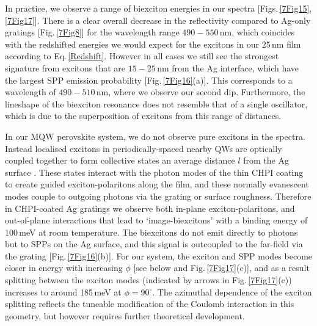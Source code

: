 In practice, we observe a range of biexciton energies in our spectra [Figs.\,\ref{7Fig15},\ref{7Fig17}]. There is a clear overall decrease in the reflectivity compared to Ag-only gratings [Fig.\,\ref{7Fig8}] for the wavelength range $490-550$\,nm, which coincides with the redshifted energies we would expect for the excitons in our 25\,nm film according to Eq.\,\ref{Redshift}. However in all cases we still see the strongest signature from excitons that are $15-25$\,nm from the Ag interface, which have the largest SPP emission probability [Fig.\,\ref{7Fig16}(a)]. This corresponds to a wavelength of $490-510$\,nm, where we observe our second dip. Furthermore, the lineshape of the biexciton resonance does not resemble that of a single oscillator, which is due to the superposition of excitons from this range of distances. %

In our MQW perovskite system, we do not observe pure excitons in the spectra. Instead localised excitons in periodically-spaced nearby QWs are optically coupled together to form collective states an average distance $l$ from the Ag surface \cite{Pbbr2008, Baumberg1998, Kavokin1998, Vladimirova1998}. These states interact with the photon modes of the thin CHPI coating to create guided exciton-polaritons along the film, and these normally evanescent modes couple to outgoing photons via the grating or surface roughness. %
Therefore in CHPI-coated Ag gratings we observe both in-plane exciton-polaritons, and out-of-plane interactions that lead to `image-biexcitons' %
with a binding energy of 100\,meV at room temperature. The biexcitons do not emit directly to photons but to SPPs on the Ag surface, and this signal is outcoupled to the far-field via the grating [Fig.\,\ref{7Fig16}(b)]. %
For our system, the exciton and SPP modes become closer in energy with increasing $\phi$ [see below and Fig.\,\ref{7Fig17}(c)], and as a result splitting between the exciton modes (indicated by arrows in Fig.\,\ref{7Fig17}(c)) increases to around 185\,meV at $\phi=90^{\circ}$. The azimuthal dependence of the exciton splitting reflects the tuneable modification of the Coulomb interaction in this geometry, but however requires further theoretical development.

